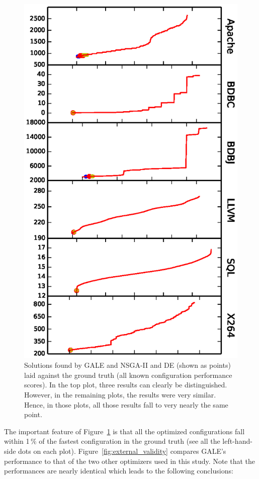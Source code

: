 \documentclass{sig-alternative}
\newcommand{\fig}[1]{Figure~\ref{fig:#1}}
\begin{document}
\begin{figure}[!t]
\includegraphics[width=0.9\linewidth]{Figures/optimizer_result.eps}
\caption{Solutions found by GALE and NSGA-II and DE (shown as points) laid against the ground truth (all known configuration performance scores). In the top plot, three results can clearly be distinguished. However, in the remaining plots, the results were very similar. Hence, in those plots, all those results
fall to very nearly the same point.}\label{fig:performance_graph}
\end{figure}


The important feature of \fig{performance_graph} is that all the optimized configurations fall within 1\,\% of the fastest
configuration in the ground truth (see all the left-hand-side dots on each plot). \fig{external_validity} compares GALE's performance to that of the two other optimizers
used in this study. Note that the performances are nearly identical which leads to the following conclusions:
\end{document}
